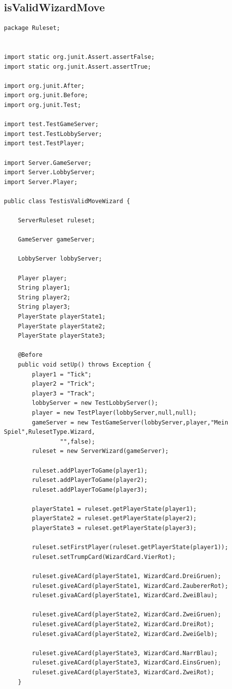 \documentclass[twoside]{article}
\begin{document}
\subsection{isValidWizardMove}
\begin{lstlisting}
package Ruleset;


import static org.junit.Assert.assertFalse;
import static org.junit.Assert.assertTrue;

import org.junit.After;
import org.junit.Before;
import org.junit.Test;

import test.TestGameServer;
import test.TestLobbyServer;
import test.TestPlayer;

import Server.GameServer;
import Server.LobbyServer;
import Server.Player;

public class TestisValidMoveWizard {
	
	ServerRuleset ruleset;
	
	GameServer gameServer;
	
	LobbyServer lobbyServer;
	
	Player player;
	String player1;
	String player2;
	String player3;
	PlayerState playerState1;
	PlayerState playerState2;
	PlayerState playerState3;
	
	@Before
	public void setUp() throws Exception {
		player1 = "Tick";
		player2 = "Trick";
		player3 = "Track";
		lobbyServer = new TestLobbyServer();
		player = new TestPlayer(lobbyServer,null,null);
		gameServer = new TestGameServer(lobbyServer,player,"Mein Spiel",RulesetType.Wizard, 
				"",false);
		ruleset = new ServerWizard(gameServer);
		
		ruleset.addPlayerToGame(player1);
		ruleset.addPlayerToGame(player2);
		ruleset.addPlayerToGame(player3);
		
		playerState1 = ruleset.getPlayerState(player1);
		playerState2 = ruleset.getPlayerState(player2);
		playerState3 = ruleset.getPlayerState(player3);
		
		ruleset.setFirstPlayer(ruleset.getPlayerState(player1));
		ruleset.setTrumpCard(WizardCard.VierRot);
		
		ruleset.giveACard(playerState1, WizardCard.DreiGruen);
		ruleset.giveACard(playerState1, WizardCard.ZaubererRot);
		ruleset.givaACard(playerState1, WizardCard.ZweiBlau);
		
		ruleset.giveACard(playerState2, WizardCard.ZweiGruen);
		ruleset.giveACard(playerState2, WizardCard.DreiRot);
		ruleset.givaACard(playerState2, WizardCard.ZweiGelb);
		
		ruleset.giveACard(playerState3, WizardCard.NarrBlau);
		ruleset.giveACard(playerState3, WizardCard.EinsGruen);
		ruleset.giveACard(playerState3, WizardCard.ZweiRot);
	}
	

\end{lstlisting}
\end{document}
